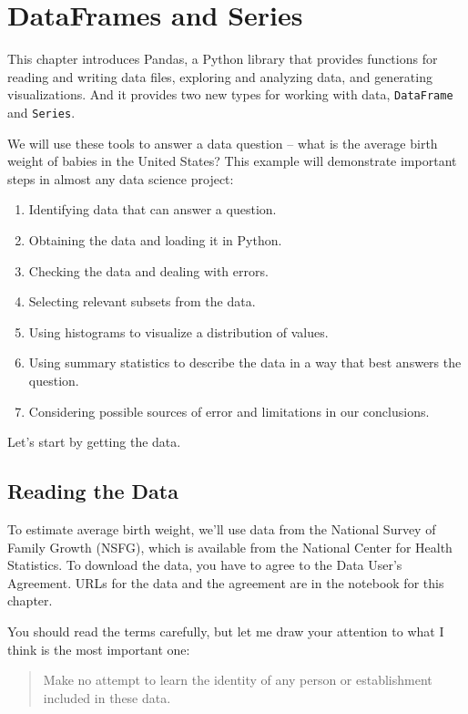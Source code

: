 \chapter{DataFrames and Series}\label{dataframes-and-series}

This chapter introduces Pandas, a Python library that provides functions
for reading and writing data files, exploring and analyzing data, and
generating visualizations. And it provides two new types for working
with data, \passthrough{\lstinline!DataFrame!} and
\passthrough{\lstinline!Series!}.

We will use these tools to answer a data question -- what is the average
birth weight of babies in the United States? This example will
demonstrate important steps in almost any data science project:

\begin{enumerate}
\def\labelenumi{\arabic{enumi}.}
\item
  Identifying data that can answer a question.
\item
  Obtaining the data and loading it in Python.
\item
  Checking the data and dealing with errors.
\item
  Selecting relevant subsets from the data.
\item
  Using histograms to visualize a distribution of values.
\item
  Using summary statistics to describe the data in a way that best
  answers the question.
\item
  Considering possible sources of error and limitations in our
  conclusions.
\end{enumerate}

Let's start by getting the data.

\section{Reading the Data}\label{reading-the-data}

To estimate average birth weight, we'll use data from the National
Survey of Family Growth (NSFG), which is available from the National
Center for Health Statistics. To download the data, you have to agree to
the Data User's Agreement. URLs for the data and the agreement are in
the notebook for this chapter.

You should read the terms carefully, but let me draw your attention to
what I think is the most important one:

\begin{quote}
Make no attempt to learn the identity of any person or establishment
included in these data.
\end{quote}

